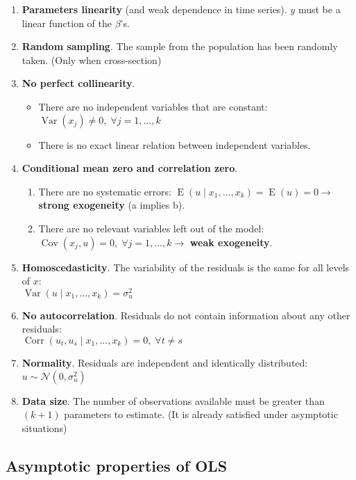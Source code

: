 \documentclass[10pt, a4paper, landscape]{article}
\DeclareMathOperator{\E}{E}
\DeclareMathOperator{\Var}{Var}
\DeclareMathOperator{\Cov}{Cov}
\DeclareMathOperator{\Corr}{Corr}
\begin{document}
\begin{multicols}{3}
\begin{enumerate}[leftmargin=*]
	\item \textbf{Parameters linearity} (and weak dependence in time series). \( y \) must be a linear function of the \( \beta \)'s.
	\item \textbf{Random sampling}. The sample from the population has been randomly taken. (Only when cross-section)
	\item \textbf{No perfect collinearity}.
	\begin{itemize}[leftmargin=*]
		\item There are no independent variables that are constant: \( \Var(x_{j}) \neq 0, \; \forall j = 1, \ldots, k \)
		\item There is no exact linear relation between independent variables.
	\end{itemize}
	\item \textbf{Conditional mean zero and correlation zero}.
	\begin{enumerate}[leftmargin=*, label=\alph{*}.]
		\item There are no systematic errors: \( \E(u \mid x_{1}, \ldots, x_{k}) = \E(u) = 0 \rightarrow \) \textbf{strong exogeneity} (a implies b).
		\item There are no relevant variables left out of the model: \( \Cov(x_{j}, u) = 0, \; \forall j = 1, \ldots, k \rightarrow \) \textbf{weak exogeneity}.
	\end{enumerate}
	\item \textbf{Homoscedasticity}. The variability of the residuals is the same for all levels of \( x \): \\ \( \Var(u \mid x_{1}, \ldots, x_{k}) = \sigma_{u}^{2} \)
	\item \textbf{No autocorrelation}. Residuals do not contain information about any other residuals: \\ \( \Corr(u_{t}, u_{s} \mid x_{1}, \ldots, x_{k}) = 0, \; \forall t \neq s \)
	\item \textbf{Normality}. Residuals are independent and identically distributed: \( u \sim \mathcal{N} (0, \sigma_{u}^{2}) \)
	\item \textbf{Data size}. The number of observations available must be greater than \( (k + 1) \) parameters to estimate. (It is already satisfied under asymptotic situations)
\end{enumerate}

\subsection*{Asymptotic properties of OLS}


\end{multicols}
\end{document}
